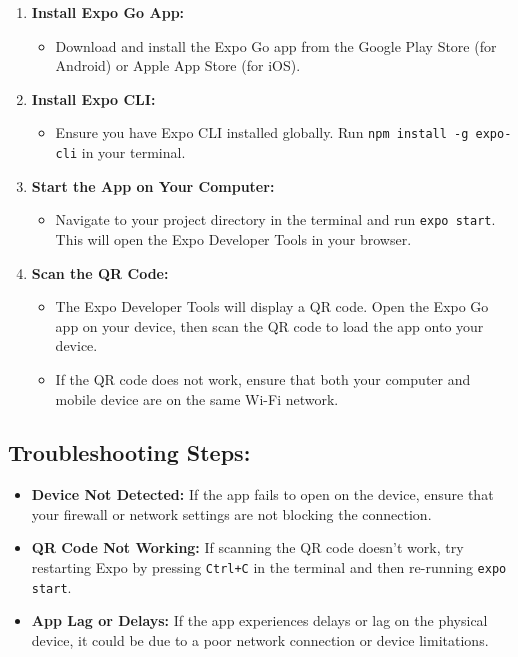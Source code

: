 \documentclass{article}
\begin{document}
\begin{enumerate}
    \item \textbf{Install Expo Go App:} 
    \begin{itemize}
        \item Download and install the Expo Go app from the Google Play Store (for Android) or Apple App Store (for iOS).
    \end{itemize}
    \item \textbf{Install Expo CLI:} 
    \begin{itemize}
        \item Ensure you have Expo CLI installed globally. Run \texttt{npm install -g expo-cli} in your terminal.
    \end{itemize}
    \item \textbf{Start the App on Your Computer:} 
    \begin{itemize}
        \item Navigate to your project directory in the terminal and run \texttt{expo start}. This will open the Expo Developer Tools in your browser.
    \end{itemize}
    \item \textbf{Scan the QR Code:} 
    \begin{itemize}
        \item The Expo Developer Tools will display a QR code. Open the Expo Go app on your device, then scan the QR code to load the app onto your device.
        \item If the QR code does not work, ensure that both your computer and mobile device are on the same Wi-Fi network.
    \end{itemize}
\end{enumerate}

\subsection*{Troubleshooting Steps:}

\begin{itemize}
    \item \textbf{Device Not Detected:} If the app fails to open on the device, ensure that your firewall or network settings are not blocking the connection.
    \item \textbf{QR Code Not Working:} If scanning the QR code doesn’t work, try restarting Expo by pressing \texttt{Ctrl+C} in the terminal and then re-running \texttt{expo start}.
    \item \textbf{App Lag or Delays:} If the app experiences delays or lag on the physical device, it could be due to a poor network connection or device limitations.\\\\\\\\\\\\\\\\\\
\end{itemize}
\\
\end{document}
